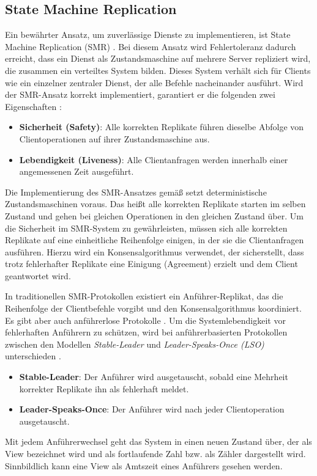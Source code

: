 \documentclass[nonacm,sigconf,natbib=false]{acmart}
\begin{document}
\subsection{State Machine Replication}

Ein bewährter Ansatz, um zuverlässige Dienste zu implementieren, ist State Machine Replication (SMR) \cite{smr-schneider}. Bei diesem Ansatz wird Fehlertoleranz dadurch erreicht, dass ein Dienst als Zustandsmaschine auf mehrere Server repliziert wird, die zusammen ein verteiltes System bilden. Dieses System verhält sich für Clients wie ein einzelner zentraler Dienst, der alle Befehle nacheinander ausführt. Wird der SMR-Ansatz korrekt implementiert, garantiert er die folgenden zwei Eigenschaften \cite{pbft-liveness-problem}:
\begin{itemize}
  \item \textbf{Sicherheit (Safety)}: Alle korrekten Replikate führen dieselbe Abfolge von Clientoperationen auf ihrer Zustandsmaschine aus.
  \item \textbf{Lebendigkeit (Liveness)}: Alle Clientanfragen werden innerhalb einer angemessenen Zeit ausgeführt.
\end{itemize}
Die Implementierung des SMR-Ansatzes gemäß \cite{smr-schneider} setzt deterministische Zustandsmaschinen voraus. Das heißt alle korrekten Replikate starten im selben Zustand und gehen bei gleichen Operationen in den gleichen Zustand über. Um die Sicherheit im SMR-System zu gewährleisten, müssen sich alle korrekten Replikate auf eine einheitliche Reihenfolge einigen, in der sie die Clientanfragen ausführen. Hierzu wird ein Konsensalgorithmus verwendet, der sicherstellt, dass trotz fehlerhafter Replikate eine Einigung (Agreement) erzielt und dem Client geantwortet wird.

In traditionellen SMR-Protokollen existiert ein Anführer-Replikat, das die Reihenfolge der Clientbefehle vorgibt und den Konsensalgorithmus koordiniert. Es gibt aber auch anführerlose Protokolle \cite{smr-leaderless}. Um die Systemlebendigkeit vor fehlerhaften Anführern zu schützen, wird bei anführerbasierten Protokollen zwischen den Modellen \emph{Stable-Leader} und \emph{Leader-Speaks-Once (LSO)} unterschieden \cite{beegees}.
\begin{itemize}
  \item \textbf{Stable-Leader}: Der Anführer wird ausgetauscht, sobald eine Mehrheit korrekter Replikate ihn als fehlerhaft meldet.
  \item \textbf{Leader-Speaks-Once}: Der Anführer wird nach jeder Clientoperation ausgetauscht.
\end{itemize}
Mit jedem Anführerwechsel geht das System in einen neuen Zustand über, der als View bezeichnet wird und als fortlaufende Zahl bzw. als Zähler dargestellt wird. Sinnbildlich kann eine View als Amtszeit eines Anführers gesehen werden.
\end{document}
